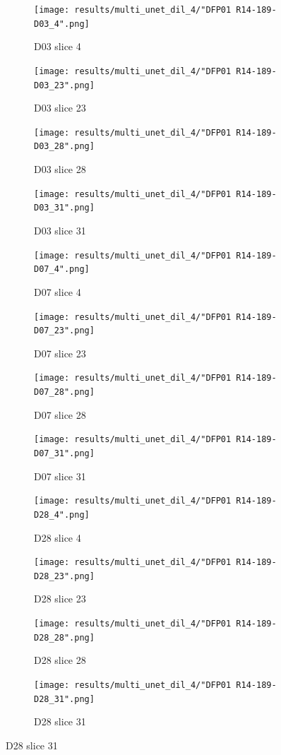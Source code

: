 \begin{figure}[!htb]  
    \centering %
\begin{subfigure}{0.25\textwidth}
  \texttt{[image: results/multi\_unet\_dil\_4/"DFP01 R14-189-D03\_4".png]}
  \caption{D03 slice 4} 
\end{subfigure}\hfil %
\begin{subfigure}{0.25\textwidth}
  \texttt{[image: results/multi\_unet\_dil\_4/"DFP01 R14-189-D03\_23".png]}
  \caption{D03 slice 23}
\end{subfigure}\hfil %
\begin{subfigure}{0.25\textwidth}
  \texttt{[image: results/multi\_unet\_dil\_4/"DFP01 R14-189-D03\_28".png]}
  \caption{D03 slice 28}
\end{subfigure}\hfil %
\begin{subfigure}{0.25\textwidth}
  \texttt{[image: results/multi\_unet\_dil\_4/"DFP01 R14-189-D03\_31".png]}
  \caption{D03 slice 31}
\end{subfigure}


\medskip
\begin{subfigure}{0.25\textwidth}
  \texttt{[image: results/multi\_unet\_dil\_4/"DFP01 R14-189-D07\_4".png]}
  \caption{D07 slice 4}
\end{subfigure}\hfil %
\begin{subfigure}{0.25\textwidth}
  \texttt{[image: results/multi\_unet\_dil\_4/"DFP01 R14-189-D07\_23".png]}
  \caption{D07 slice 23}
\end{subfigure}\hfil %
\begin{subfigure}{0.25\textwidth}
  \texttt{[image: results/multi\_unet\_dil\_4/"DFP01 R14-189-D07\_28".png]}
  \caption{D07 slice 28}
\end{subfigure}\hfil %
\begin{subfigure}{0.25\textwidth}
  \texttt{[image: results/multi\_unet\_dil\_4/"DFP01 R14-189-D07\_31".png]}
  \caption{D07 slice 31}
\end{subfigure}


\medskip
\begin{subfigure}{0.25\textwidth}
  \texttt{[image: results/multi\_unet\_dil\_4/"DFP01 R14-189-D28\_4".png]}
  \caption{D28 slice 4}
\end{subfigure}\hfil %
\begin{subfigure}{0.25\textwidth}
  \texttt{[image: results/multi\_unet\_dil\_4/"DFP01 R14-189-D28\_23".png]}
  \caption{D28 slice 23}
\end{subfigure}\hfil %
\begin{subfigure}{0.25\textwidth}
  \texttt{[image: results/multi\_unet\_dil\_4/"DFP01 R14-189-D28\_28".png]}
  \caption{D28 slice 28}
\end{subfigure}\hfil %
\begin{subfigure}{0.25\textwidth}
  \texttt{[image: results/multi\_unet\_dil\_4/"DFP01 R14-189-D28\_31".png]}
  \caption{D28 slice 31}
\end{subfigure}
  

\end{figure}
